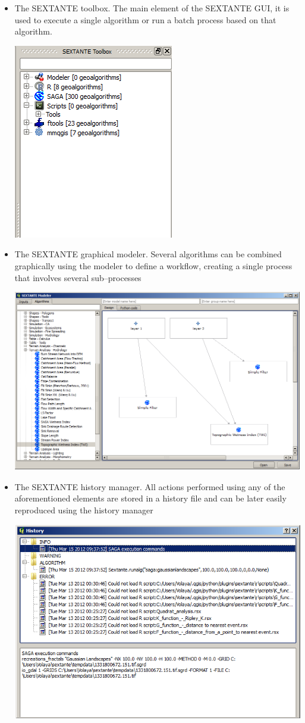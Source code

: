 \begin{itemize}
	\item The SEXTANTE toolbox. The main element of the SEXTANTE GUI, it is used to execute a single algorithm or run a batch process based on that algorithm.
		\begin{center}
		\includegraphics[width=.5\columnwidth]{toolbox.png}
		\end{center}
	\item The SEXTANTE graphical modeler. Several algorithms can be combined graphically using the modeler to define a workflow, creating a single process that involves several sub--processes
		\begin{center}
		\includegraphics[width=.9\columnwidth]{models.png}
		\end{center}			
	\item The SEXTANTE history manager. All actions performed using any of the aforementioned elements are stored in a history file and can be later easily reproduced using the history manager
			\begin{center}
			\includegraphics[width=.8\columnwidth]{history.png}

\end{center}
\end{itemize}
